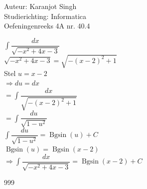 \documentclass[a4paper]{article}
\DeclareMathOperator{\Bgsin}{Bgsin}
\begin{document}
\noindent \large Auteur: Karanjot Singh \\
\noindent \large Studierichting: Informatica \\
\noindent \large Oefeningenreeks 4A nr. 40.4 \\

\normalsize

$\displaystyle\int \dfrac{dx}{\sqrt{-x^2 + 4x - 3}}$ \\

$\sqrt{-x^2 + 4x - 3} = \sqrt{-(x - 2)^2 + 1}$ \\

Stel $u = x - 2$ \\

$\Rightarrow du = dx$ \\

$= \displaystyle\int \dfrac{dx}{\sqrt{-(x - 2)^2 + 1}}$ \\

$= \displaystyle\int \dfrac{du}{\sqrt{1 - u^2}}$ \\

$\displaystyle\int \dfrac{du}{\sqrt{1 - u^2}} = \Bgsin(u) + C$ \\

$\Bgsin(u) = \Bgsin(x - 2)$ \\

$\Rightarrow \displaystyle\int \dfrac{dx}{\sqrt{-x^2 + 4x - 3}} = \Bgsin(x - 2) + C$ \\

\begin{thebibliography}{999}
\end{thebibliography}
\end{document}
